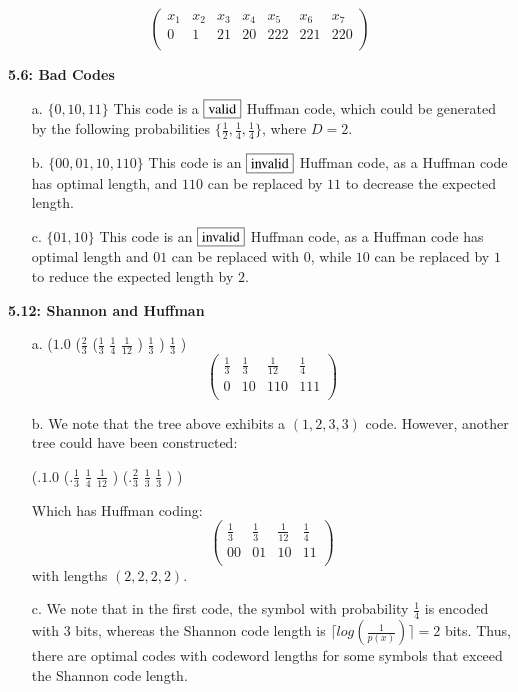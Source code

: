 \documentclass[10pt]{article}
\begin{document}
\begin{tiny}
\begin{multicols}{3}
\begin{itemize}
\[
 \begin{pmatrix}
	x_1 & x_2 & x_3 & x_4 & x_5 & x_6 & x_7 \\
	0   & 1   & 21  & 20  & 222 & 221 & 220 \\
 \end{pmatrix}
\]
\end{itemize}

\textbf{5.6: Bad Codes}

\begin{itemize}
	\item[a.] $ \{0, 10, 11 \} $ This code is a $\fbox{valid}$ Huffman code, which could be generated by the following probabilities $\{ \frac{1}{2}, \frac{1}{4}, \frac{1}{4} \}$, where $D=2$.
	\item[b.] $ \{00, 01, 10, 110 \} $ This code is an $\fbox{invalid}$ Huffman code, as a Huffman code has optimal length, and $110$ can be replaced by $11$ to decrease the expected length.  
	\item[c.] $ \{01, 10 \} $ This code is an $\fbox{invalid}$ Huffman code, as a Huffman code has optimal length and $01$ can be replaced with $0$, while $10$ can be replaced by $1$ to reduce the expected length by $2$.
\end{itemize}

\textbf{5.12: Shannon and Huffman}
\begin{itemize}
	\item[a.]
($1.0$ ($\frac{2}{3}$ ($\frac{1}{3}$ $\frac{1}{4}$ $\frac{1}{12}$ ) $\frac{1}{3}$ ) $\frac{1}{3}$ )
\[
 \begin{pmatrix}
	\frac{1}{3} & \frac{1}{3} & \frac{1}{12} & \frac{1}{4}\\
	0           &  10         & 110          & 111\\
 \end{pmatrix}
\]
	\item[b.] We note that the tree above exhibits a $(1,2,3,3)$ code. However, another tree could have been constructed: 

(.$1.0$ (.$\frac{1}{3}$ $\frac{1}{4}$ $\frac{1}{12}$ ) (.$\frac{2}{3}$ $\frac{1}{3}$ $\frac{1}{3}$ ) ) 

Which has Huffman coding:
\[
 \begin{pmatrix}
	\frac{1}{3} & \frac{1}{3} & \frac{1}{12} & \frac{1}{4}\\
	00           &  01         & 10          & 11\\
 \end{pmatrix}
\] with lengths $(2, 2, 2, 2)$.
	\item[c.] We note that in the first code, the symbol with probability $\frac{1}{4}$ is encoded with $3$ bits, whereas the Shannon code length is $\lceil log(\frac{1}{p(x)}) \rceil = 2$ bits. Thus, there are optimal codes with codeword lengths for some symbols that exceed the Shannon code length.
\end{itemize}


\end{multicols}
\end{tiny}
\end{document}
